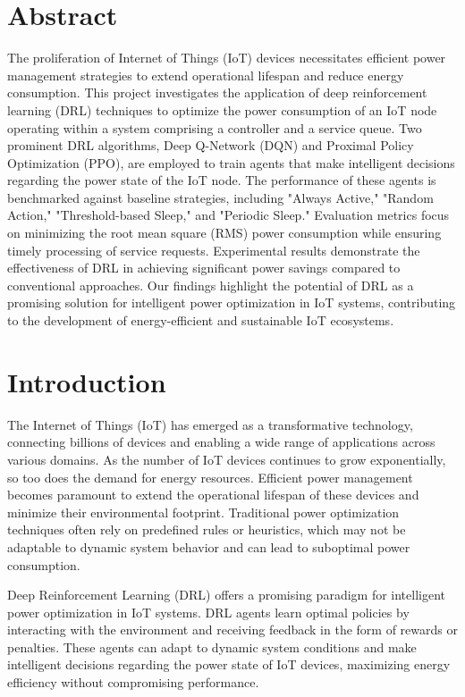 \documentclass[11pt,a4paper]{article}
\begin{document}
\section{Abstract}
The proliferation of Internet of Things (IoT) devices necessitates efficient power management strategies to extend operational lifespan and reduce energy consumption. This project investigates the application of deep reinforcement learning (DRL) techniques to optimize the power consumption of an IoT node operating within a system comprising a controller and a service queue. Two prominent DRL algorithms, Deep Q-Network (DQN) and Proximal Policy Optimization (PPO), are employed to train agents that make intelligent decisions regarding the power state of the IoT node. The performance of these agents is benchmarked against baseline strategies, including "Always Active," "Random Action," "Threshold-based Sleep," and "Periodic Sleep." Evaluation metrics focus on minimizing the root mean square (RMS) power consumption while ensuring timely processing of service requests. Experimental results demonstrate the effectiveness of DRL in achieving significant power savings compared to conventional approaches. Our findings highlight the potential of DRL as a promising solution for intelligent power optimization in IoT systems, contributing to the development of energy-efficient and sustainable IoT ecosystems.

\section{Introduction}
The Internet of Things (IoT) has emerged as a transformative technology, connecting billions of devices and enabling a wide range of applications across various domains. As the number of IoT devices continues to grow exponentially, so too does the demand for energy resources. Efficient power management becomes paramount to extend the operational lifespan of these devices and minimize their environmental footprint. Traditional power optimization techniques often rely on predefined rules or heuristics, which may not be adaptable to dynamic system behavior and can lead to suboptimal power consumption.

Deep Reinforcement Learning (DRL) offers a promising paradigm for intelligent power optimization in IoT systems. DRL agents learn optimal policies by interacting with the environment and receiving feedback in the form of rewards or penalties. These agents can adapt to dynamic system conditions and make intelligent decisions regarding the power state of IoT devices, maximizing energy efficiency without compromising performance.
\end{document}
